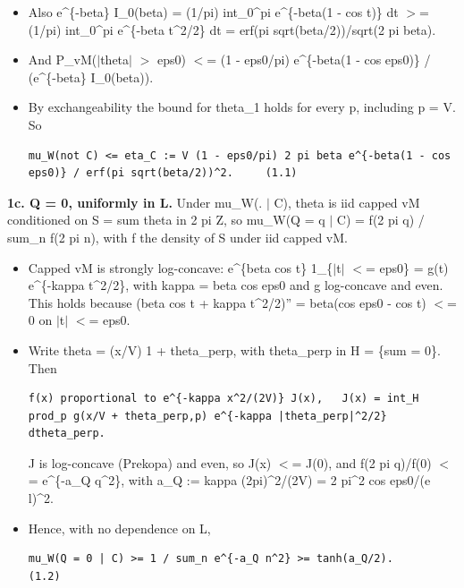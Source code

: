 \documentclass[11pt,a4paper]{article}
\begin{document}
\begin{itemize}
\item{} Also e\textasciicircum{}\{-beta\} I\_0(beta) = (1/pi) int\_0\textasciicircum{}pi e\textasciicircum{}\{-beta(1 - cos t)\} dt $>$= (1/pi) int\_0\textasciicircum{}pi e\textasciicircum{}\{-beta t\textasciicircum{}2/2\} dt
= erf(pi sqrt(beta/2))/sqrt(2 pi beta).
\item{} And P\_vM($|$theta$|$ $>$ eps0) $<$= (1 - eps0/pi) e\textasciicircum{}\{-beta(1 - cos eps0)\} / (e\textasciicircum{}\{-beta\} I\_0(beta)).
\item{} By exchangeability the bound for theta\_1 holds for every p, including p = V. So
\begin{Verbatim}[breaklines=true,breakanywhere=true,fontsize=\small]
mu_W(not C) <= eta_C := V (1 - eps0/pi) 2 pi beta e^{-beta(1 - cos eps0)} / erf(pi sqrt(beta/2))^2.     (1.1)
\end{Verbatim}

\end{itemize}

{\bfseries\boldmath 1c. Q = 0, uniformly in L.} Under mu\_W(. $|$ C), theta is iid capped vM conditioned on S = sum theta in 2 pi Z, so
mu\_W(Q = q $|$ C) = f(2 pi q) / sum\_n f(2 pi n), with f the density of S under iid capped vM.

\begin{itemize}
\item{} Capped vM is strongly log-concave: e\textasciicircum{}\{beta cos t\} 1\_\{$|$t$|$ $<$= eps0\} = g(t) e\textasciicircum{}\{-kappa t\textasciicircum{}2/2\}, with
kappa = beta cos eps0 and g log-concave and even. This holds because (beta cos t + kappa t\textasciicircum{}2/2)'' =
beta(cos eps0 - cos t) $<$= 0 on $|$t$|$ $<$= eps0.
\item{} Write theta = (x/V) 1 + theta\_perp, with theta\_perp in H = \{sum = 0\}. Then
\begin{Verbatim}[breaklines=true,breakanywhere=true,fontsize=\small]
f(x) proportional to e^{-kappa x^2/(2V)} J(x),   J(x) = int_H prod_p g(x/V + theta_perp,p) e^{-kappa |theta_perp|^2/2} dtheta_perp.
\end{Verbatim}

J is log-concave (Prekopa) and even, so J(x) $<$= J(0), and f(2 pi q)/f(0) $<$= e\textasciicircum{}\{-a\_Q q\textasciicircum{}2\}, with
a\_Q := kappa (2pi)\textasciicircum{}2/(2V) = 2 pi\textasciicircum{}2 cos eps0/(e l)\textasciicircum{}2.
\item{} Hence, with no dependence on L,
\begin{Verbatim}[breaklines=true,breakanywhere=true,fontsize=\small]
mu_W(Q = 0 | C) >= 1 / sum_n e^{-a_Q n^2} >= tanh(a_Q/2).                                               (1.2)
\end{Verbatim}

\end{itemize}
\end{document}

